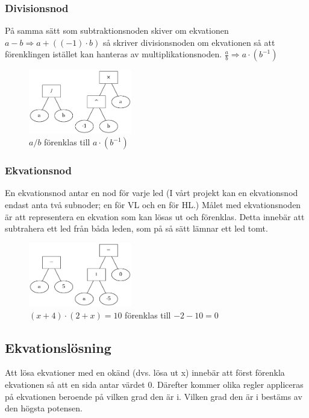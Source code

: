 \documentclass[12pt,a4paper]{article}
\begin{document}
\subsubsection{Divisionsnod}
\label{subsubsec:divnode}
På samma sätt som subtraktionsnoden skiver om ekvationen \(a-b\Rightarrow a+((-1) \cdot b)\) så skriver divisionsnoden om ekvationen så att förenklingen istället kan hanteras av multiplikationsnoden. \(\frac{a}{b}\Rightarrow a \cdot (b^{-1})\)
\begin{figure}[h!]
  \centering
  \includegraphics[width=0.4\textwidth]{image-merged4.png}
  \caption{\(a/b\) förenklas till \(a \cdot (b^{-1})\)}
\end{figure}
\subsubsection{Ekvationsnod}
En ekvationsnod antar en nod för varje led (I vårt projekt kan en ekvationsnod endast anta två subnoder; en för VL och en för HL.) Målet med ekvationsnoden är att representera en ekvation som kan lösas ut och förenklas. Detta innebär att subtrahera ett led från båda leden, som på så sätt lämnar ett led tomt.
\begin{figure}[h!]
  \centering
  \includegraphics[width=0.4\textwidth]{image-merged5.png}
  \caption{\((x+4)\cdot (2+x)=10\) förenklas till \(-2-10=0\)}
\end{figure}
\subsection{Ekvationslösning}
Att lösa ekvationer med en okänd (dvs. lösa ut x) innebär att först förenkla ekvationen så att en sida antar värdet 0. Därefter kommer olika regler appliceras på ekvationen beroende på vilken grad den är i. Vilken grad den är i bestäms av den högsta potensen.
\end{document}

